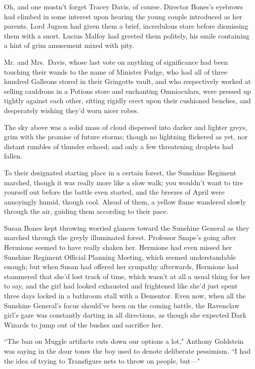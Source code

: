 Oh, and one mustn't forget Tracey Davis, of course. Director Bones's eyebrows had climbed in some interest upon hearing the young couple introduced as her parents. Lord Jugson had given them a brief, incredulous stare before dismissing them with a snort. Lucius Malfoy had greeted them politely, his smile containing a hint of grim amusement mixed with pity.

Mr. and Mrs.~Davis, whose last vote on anything of significance had been touching their wands to the name of Minister Fudge, who had all of three hundred Galleons stored in their Gringotts vault, and who respectively worked at selling cauldrons in a Potions store and enchanting Omnioculars, were pressed up tightly against each other, sitting rigidly erect upon their cushioned benches, and desperately wishing they'd worn nicer robes.

The sky above was a solid mass of cloud dispersed into darker and lighter greys, grim with the promise of future storms; though no lightning flickered as yet, nor distant rumbles of thunder echoed; and only a few threatening droplets had fallen.

\later

To their designated starting place in a certain forest, the Sunshine Regiment marched, though it was really more like a slow walk; you wouldn't want to tire yourself out before the battle even started, and the breezes of April were annoyingly humid, though cool. Ahead of them, a yellow flame wandered slowly through the air, guiding them according to their pace.

Susan Bones kept throwing worried glances toward the Sunshine General as they marched through the greyly illuminated forest. Professor Snape's going after Hermione seemed to have really shaken her. Hermione had even missed her Sunshine Regiment Official Planning Meeting, which seemed understandable enough; but when Susan had offered her sympathy afterwards, Hermione had stammered that she'd lost track of time, which wasn't at all a usual thing for her to say, and the girl had looked exhausted and frightened like she'd just spent three days locked in a bathroom stall with a Dementor. Even now, when all the Sunshine General's focus should've been on the coming battle, the Ravenclaw girl's gaze was constantly darting in all directions, as though she expected Dark Wizards to jump out of the bushes and sacrifice her.

``The ban on Muggle artifacts cuts down our options a lot," Anthony Goldstein was saying in the dour tones the boy used to denote deliberate pessimism. ``I had the idea of trying to Transfigure nets to throw on people, but—"

